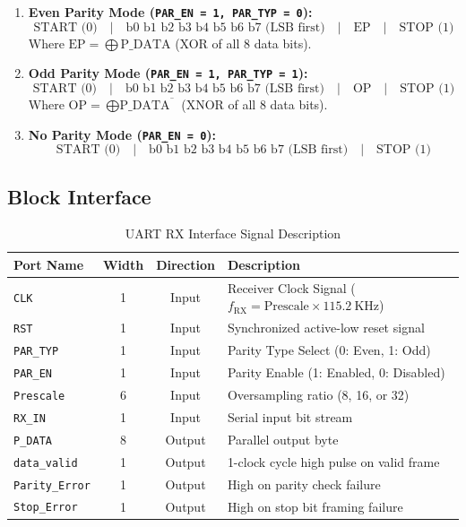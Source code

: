 \documentclass[12pt,a4paper]{article}
\begin{document}
\begin{enumerate}
    \item \textbf{Even Parity Mode (\texttt{PAR\_EN = 1, PAR\_TYP = 0}):}
    \[
    \text{START (0)} \quad | \quad \text{b0 b1 b2 b3 b4 b5 b6 b7 (LSB first)} \quad | \quad \text{EP} \quad | \quad \text{STOP (1)}
    \]
    Where $\text{EP} = \bigoplus \text{P\_DATA}$ (XOR of all 8 data bits).

    \item \textbf{Odd Parity Mode (\texttt{PAR\_EN = 1, PAR\_TYP = 1}):}
    \[
    \text{START (0)} \quad | \quad \text{b0 b1 b2 b3 b4 b5 b6 b7 (LSB first)} \quad | \quad \text{OP} \quad | \quad \text{STOP (1)}
    \]
    Where $\text{OP} = \overline{\bigoplus \text{P\_DATA}}$ (XNOR of all 8 data bits).

    \item \textbf{No Parity Mode (\texttt{PAR\_EN = 0}):}
    \[
    \text{START (0)} \quad | \quad \text{b0 b1 b2 b3 b4 b5 b6 b7 (LSB first)} \quad | \quad \text{STOP (1)}
    \]
\end{enumerate}

\subsection{Block Interface}

\begin{table}[H]
\centering
\caption{UART RX Interface Signal Description}
\begin{tabular}{lccl}
\toprule
\textbf{Port Name} & \textbf{Width} & \textbf{Direction} & \textbf{Description} \\
\midrule
\texttt{CLK}          & 1 & Input  & Receiver Clock Signal ($f_{\text{RX}} = \text{Prescale} \times 115.2~\text{KHz}$) \\
\texttt{RST}          & 1 & Input  & Synchronized active-low reset signal \\
\texttt{PAR\_TYP}     & 1 & Input  & Parity Type Select (0: Even, 1: Odd) \\
\texttt{PAR\_EN}      & 1 & Input  & Parity Enable (1: Enabled, 0: Disabled) \\
\texttt{Prescale}     & 6 & Input  & Oversampling ratio (8, 16, or 32) \\
\texttt{RX\_IN}        & 1 & Input  & Serial input bit stream \\
\texttt{P\_DATA}       & 8 & Output & Parallel output byte \\
\texttt{data\_valid}   & 1 & Output & 1-clock cycle high pulse on valid frame \\
\texttt{Parity\_Error} & 1 & Output & High on parity check failure \\
\texttt{Stop\_Error}   & 1 & Output & High on stop bit framing failure \\
\bottomrule
\end{tabular}
\end{table}
\end{document}
